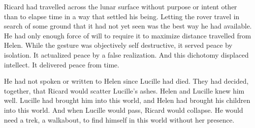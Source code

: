 

﻿Ricard had travelled across the lunar surface without purpose or
intent other than to elapse time in a way that settled his being.
Letting the rover travel in search of some ground that it had not yet
seen was the best way he had available.  He had only enough force of
will to require it to maximize distance travelled from Helen.  While
the gesture was objectively self destructive, it served peace by
isolation.  It actualized peace by a false realization.  And this
dichotomy displaced intellect.  It delivered peace from time.

He had not spoken or written to Helen since Lucille had died.  They
had decided, together, that Ricard would scatter Lucille's ashes.
Helen and Lucille knew him well.  Lucille had brought him into this
world, and Helen had brought his children into this world.  And when
Lucille would pass, Ricard would collapse.  He would need a trek, a
walkabout, to find himself in this world without her presence.

\bye
